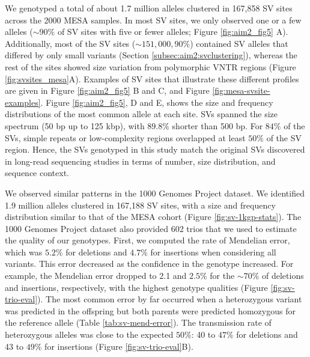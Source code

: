 \documentclass[11pt]{ucscthesis}
\begin{document}
We genotyped a total of about 1.7 million alleles clustered in 167,858 SV sites across the 2000 MESA samples.
In most SV sites, we only observed one or a few alleles ($\sim90\%$ of SV sites with five or fewer alleles; Figure \ref{fig:aim2_fig5} A).
Additionally, most of the SV sites ($\sim151,000, 90\%$) contained SV alleles that differed by only small variants (Section \ref{subsec:aim2:svclustering}), whereas the rest of the sites showed size variation from polymorphic VNTR regions (Figure \ref{fig:svsites_mesa}A).
Examples of SV sites that illustrate these different profiles are given in Figure \ref{fig:aim2_fig5} B and C, and Figure \ref{fig:mesa-svsite-examples}.
Figure \ref{fig:aim2_fig5}, D and E, shows the size and frequency distributions of the most common allele at each site.
SVs spanned the size spectrum (50 bp up to 125 kbp), with $89.8\%$ shorter than 500 bp.
For $84\%$ of the SVs, simple repeats or low-complexity regions overlapped at least $50\%$ of the SV region.
Hence, the SVs genotyped in this study match the original SVs discovered in long-read sequencing studies \cite{zook_robust_2020,chaisson_sv_2019,audano_hgsvc} in terms of number, size distribution, and sequence context.

We observed similar patterns in the 1000 Genomes Project dataset.
We identified 1.9 million alleles clustered in 167,188 SV sites, with a size and frequency distribution similar to that of the MESA cohort (Figure \ref{fig:sv-1kgp-stats}).
The 1000 Genomes Project dataset also provided 602 trios that we used to estimate the quality of our genotypes.
First, we computed the rate of Mendelian error, which was $5.2\%$ for deletions and $4.7\%$ for insertions when considering all variants.
This error decreased as the confidence in the genotype increased. For example, the Mendelian error dropped to 2.1 and $2.5\%$ for the $\sim70\%$ of deletions and insertions, respectively, with the highest genotype qualities (Figure \ref{fig:sv-trio-eval}).
The most common error by far occurred when a heterozygous variant was predicted in the offspring but both parents were predicted homozygous for the reference allele (Table \ref{tab:sv-mend-error}).
The transmission rate of heterozygous alleles was close to the expected $50\%$: 40 to $47\%$ for deletions and 43 to $49\%$ for insertions (Figure \ref{fig:sv-trio-eval}B).
\end{document}
